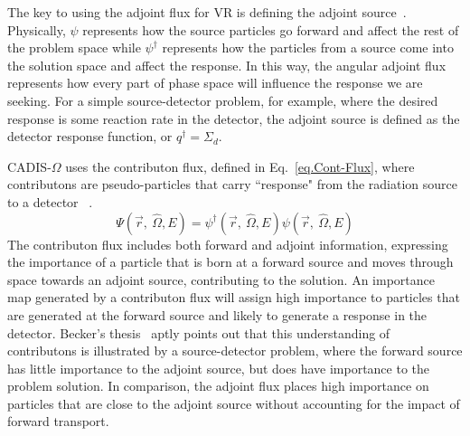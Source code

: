\documentclass[12pt]{article}
\newcommand{\vOmega}{\ensuremath{\hat{\Omega}}}
\begin{document}
The key to using the adjoint flux for VR is defining the adjoint source~\cite{wagner_forward-weighted_2007}. 
Physically, $\psi$ represents how the source particles go forward and affect the rest of the problem space while $\psi^{\dagger}$ represents how the particles from a source come into the solution space and affect the response. 
In this way, the angular adjoint flux represents how every part of phase space will influence the response we are seeking.
For a simple source-detector problem, for example, where the desired response is some reaction rate in the detector, the adjoint source is defined as the detector response function, or $q^\dagger = \Sigma _{ d }$. 

CADIS-$\Omega$ uses the contributon flux, defined in Eq.~\eqref{eq.Cont-Flux}, where contributons are pseudo-particles that carry ``response" from the radiation source to a detector ~\cite{williams_generalized_1991,williams_contributorn_1992,williams_contributon_study}. 
%
\begin{equation}
\Psi (\vec {r},\:\hat\Omega ,E) = \psi^{\dagger} (\vec {r},\:\hat\Omega ,E) \psi(\vec {r} ,\:\hat\Omega,E)
\label{eq.Cont-Flux} 
\end{equation}
%
The contributon flux includes both forward and adjoint information, expressing the importance of a particle that is born at a forward source and moves through space towards an adjoint source, contributing to the solution.
An importance map generated by a contributon flux will assign high importance to particles that are generated at the forward source and likely to generate a response in the detector. 
Becker's thesis~\cite{becker_hybrid_2009} aptly points out that this understanding of contributons is illustrated by a source-detector problem, where the forward source has little importance to the adjoint source, but does have importance to the problem solution.
In comparison, the adjoint flux places high importance on particles that are close to the adjoint source without accounting for the impact of forward transport. 
\end{document}
